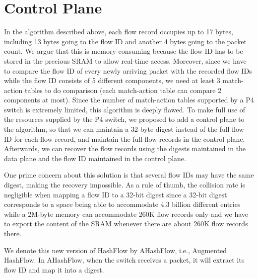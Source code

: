 \section{Control Plane}
\label{section:controlplane}
In the algorithm described above, each flow record occupies up to 17 bytes, including 13 bytes going to the flow ID and another 4 bytes going to the packet count. We argue that this is memory-consuming because the flow ID has to be stored in the precious SRAM to allow real-time access. Moreover, since we have to compare the flow ID of every newly arriving packet with the recorded flow IDs while the flow ID consists of 5 different components, we need at least 3 match-action tables to do comparison (each match-action table can compare 2 components at most). Since the number of match-action tables supported by a P4 switch is extremely limited, this algorithm is deeply flawed. To make full use of the resources supplied by the P4 switch, we proposed to add a control plane to the algorithm, so that we can maintain a 32-byte digest instead of the full flow ID for each flow record, and maintain the full flow records in the control plane. Afterwards, we can recover the flow records using the digests maintained in the data plane and the flow ID maintained in the control plane.

One prime concern about this solution is that several flow IDs may have the same digest, making the recovery impossible. As a rule of thumb, the collision rate is negligible when mapping a flow ID to a 32-bit digest since a 32-bit digest corresponds to a space being able to accommodate 4.3 billion different entries while a 2M-byte memory can accommodate 260K flow records only and we have to export the content of the SRAM whenever there are about 260K flow records there. 

We denote this new version of HashFlow by AHashFlow, i.e., Augmented HashFlow. In AHashFlow, when the switch receives a packet, it will extract its flow ID and map it into a digest. 


